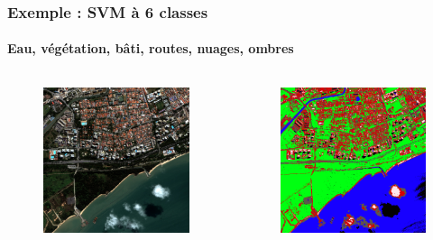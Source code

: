 \documentclass[compress]{beamer}
\begin{document}
\begin{frame}
\frametitle{Exemple : SVM à 6 classes}
\framesubtitle{Eau, végétation, bâti, routes, nuages, ombres}
\begin{columns}
\begin{column}{0.5\textwidth}
\begin{figure}[]
  \includegraphics[width=1.0\textwidth]{radio2-extract-3b.jpg}
\end{figure}
\end{column}
\begin{column}{0.5\textwidth}
\begin{figure}[]
  \includegraphics[width=1.0\textwidth]{svm-6-classes.png}
\end{figure}
\end{column}
\end{columns}
\end{frame}
\end{document}
